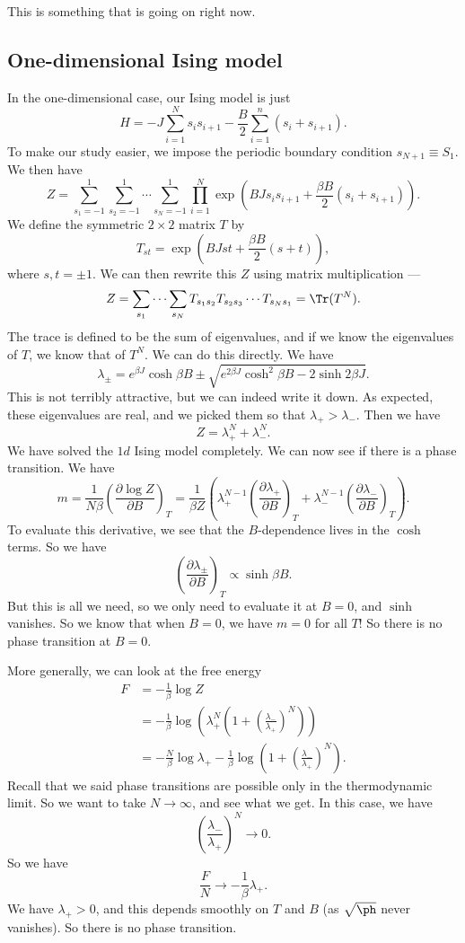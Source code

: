 \documentclass[a4paper]{article}
\begin{document}
This is something that is going on right now.

\subsection{One-dimensional Ising model}
In the one-dimensional case, our Ising model is just
\[
  H = -J \sum_{i = 1}^N s_i s_{i + 1} - \frac{B}{2} \sum_{i = 1}^n (s_i + s_{i + 1}).
\]
To make our study easier, we impose the periodic boundary condition $s_{N + 1} \equiv S_1$. We then have
\[
  Z = \sum_{s_1 = -1}^1 \sum_{s_2 = -1}^1 \cdots \sum_{s_N = -1}^1 \prod_{i = 1}^N \exp\left(B J s_i s_{i + 1} + \frac{\beta B}{2} (s_i + s_{i + 1})\right).
\]
We define the symmetric $2 \times 2$ matrix $T$ by
\[
  T_{st} = \exp\left(BJst + \frac{\beta B}{2} (s + t)\right),
\]
where $s, t = \pm 1$. We can then rewrite this $Z$ using matrix multiplication ---
\[
  Z = \sum_{s_1} \cdots \sum_{s_N} T_{s_1 s_2} T_{s_2 s_3} \cdots T_{s_N s_1} = \Tr (T^N).
\]
The trace is defined to be the sum of eigenvalues, and if we know the eigenvalues of $T$, we know that of $T^N$. We can do this directly. We have
\[
  \lambda_{\pm} = e^{\beta J} \cosh \beta B \pm \sqrt{e^{2\beta J} \cosh^2 \beta B - 2 \sinh 2 \beta J}.
\]
This is not terribly attractive, but we can indeed write it down. As expected, these eigenvalues are real, and we picked them so that $\lambda_+ > \lambda_-$. Then we have
\[
  Z = \lambda_+^N + \lambda_-^N.
\]
We have solved the $1d$ Ising model completely. We can now see if there is a phase transition. We have
\[
  m = \frac{1}{N\beta} \left(\frac{\partial \log Z}{\partial B}\right)_T = \frac{1}{\beta Z} \left(\lambda_+^{N - 1} \left(\frac{\partial \lambda_+}{\partial B}\right)_T + \lambda_-^{N - 1} \left(\frac{\partial \lambda_-}{\partial B}\right)_T\right).
\]
To evaluate this derivative, we see that the $B$-dependence lives in the $\cosh$ terms. So we have
\[
  \left( \frac{\partial \lambda_{\pm}}{\partial B}\right)_T \propto \sinh \beta B.
\]
But this is all we need, so we only need to evaluate it at $B = 0$, and $\sinh$ vanishes. So we know that when $B = 0$, we have $m = 0$ for all $T$! So there is no phase transition at $B = 0$.

More generally, we can look at the free energy
\begin{align*}
  F &= - \frac{1}{\beta} \log Z \\
  &= -\frac{1}{\beta} \log \left(\lambda_+^N \left( 1 + \left(\frac{\lambda_-}{\lambda_+}\right)^N\right)\right)\\
  &= - \frac{N}{\beta} \log \lambda_+ - \frac{1}{\beta} \log \left(1 + \left(\frac{\lambda_-}{\lambda_+}\right)^N\right).
\end{align*}
Recall that we said phase transitions are possible only in the thermodynamic limit. So we want to take $N \to \infty$, and see what we get. In this case, we have
\[
  \left(\frac{\lambda_-}{\lambda_+}\right)^N \to 0.
\]
So we have
\[
  \frac{F}{N} \to - \frac{1}{\beta} \lambda_+.
\]
We have $\lambda_+ > 0$, and this depends smoothly on $T$ and $B$ (as $\sqrt{\ph}$ never vanishes). So there is no phase transition.
\end{document}

